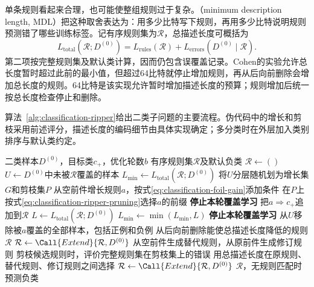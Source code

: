 单条规则看起来合理，也可能使整组规则过于复杂。（minimum description length, MDL）把这种取舍表达为：用多少比特写下规则，再用多少比特说明规则预测错了哪些训练标签。记有序规则集为$\mathcal{R}$，总描述长度可概括为
\begin{equation}
  L_{\mathrm{total}}(\mathcal{R};D^{(0)})
  =L_{\mathrm{rules}}(\mathcal{R})
   +L_{\mathrm{errors}}(D^{(0)}\mid\mathcal{R}).
  \label{eq:classification-rule-description-length}
\end{equation}
第二项按完整规则集及默认类计算，因而仍包含误覆盖记录。Cohen的实验允许总长度暂时超过此前的最小值，但超过64比特就停止增加规则，再从后向前删除会增加总长度的规则。64比特是该实现允许暂时增加描述长度的预算；规则增加后统一按总长度检查停止和删除。

算法~\ref{alg:classification-ripper}给出二类子问题的主要流程。伪代码中的增长和剪枝采用前述评分，描述长度的编码细节由具体实现确定；多分类时在外层加入类别排序与默认类约定。

\begin{algorithm}[RIPPER的覆盖学习与规则优化]
  \label{alg:classification-ripper}
  \begin{algorithmic}[1]
    \Require 二类样本$D^{(0)}$，目标类$c_+$，优化轮数$b$
    \Ensure 有序规则集$\mathcal{R}$及默认负类
    \State $\mathcal{R}\gets()$
      \State $U\gets D^{(0)}$中未被$\mathcal{R}$覆盖的样本
      \State $L_{\min}\gets L_{\mathrm{total}}(\mathcal{R};D^{(0)})$
        \State 将$U$分层随机划为增长集$G$和剪枝集$P$
        \State 从空前件增长规则$a$，按式\eqref{eq:classification-foil-gain}添加条件
        \State 在$P$上按式\eqref{eq:classification-ripper-pruning}选择$a$的前缀
          \State \textbf{停止本轮覆盖学习}
        \EndIf
        \State 把$a\Longrightarrow c_+$追加到$\mathcal{R}$
        \State $L\gets L_{\mathrm{total}}(\mathcal{R};D^{(0)})$
        \State $L_{\min}\gets\min(L_{\min},L)$
          \State \textbf{停止本轮覆盖学习}
        \EndIf
        \State 从$U$移除被$a$覆盖的全部样本，包括正例和负例
      \EndWhile
      \State 从后向前删除能使总描述长度降低的规则
      \State \Return $\mathcal{R}$
    \EndFunction
    \State $\mathcal{R}\gets\Call{Extend}{\mathcal{R},D^{(0)}}$
        \State 从空前件生成替代规则，从原前件生成修订规则
        \State 剪枝候选规则时，评价完整规则集在剪枝集上的错误
        \State 用总描述长度在原规则、替代规则、修订规则之间选择
      \EndFor
      \State $\mathcal{R}\gets\Call{Extend}{\mathcal{R},D^{(0)}}$
    \EndFor
    \State \Return $\mathcal{R}$，无规则匹配时预测负类
  \end{algorithmic}
\end{algorithm}

